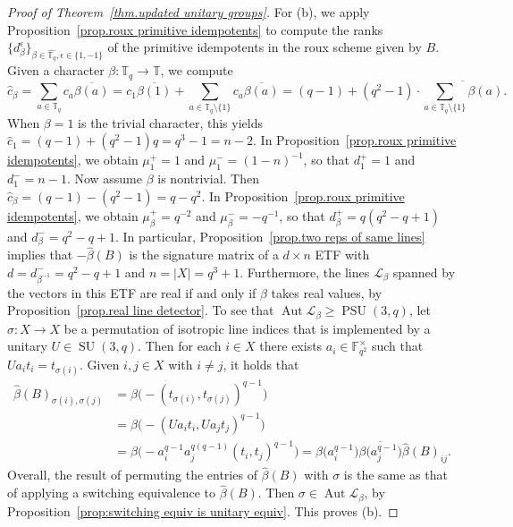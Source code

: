 \begin{proof}[Proof of Theorem~\ref{thm.updated unitary groups}]
For (b), we apply Proposition~\ref{prop.roux primitive idempotents} to compute the ranks $\{ d_\beta^\epsilon \}_{\beta \in \hat{\mathbb{T}_q}, \epsilon \in \{1,-1\}}$ of the primitive idempotents in the roux scheme given by $B$.
Given a character $\beta \colon \mathbb{T}_q \to \mathbb{T}$, we compute
\[
\hat{c}_{\beta} = \sum_{a \in \mathbb{T}_q} c_a \overline{\beta(a)}
= c_1 \overline{\beta(1)} + \sum_{a \in \mathbb{T}_q \setminus \{1\} } c_a \overline{\beta(a)}
= (q-1) + (q^2-1) \cdot \overline{ \sum_{a\in \mathbb{T}_q \setminus\{1\} } \beta(a) }.
\]
When $\beta=1$ is the trivial character, this yields $\hat{c}_1 = (q-1) + (q^2-1)q = q^3-1 = n-2$.
In Proposition~\ref{prop.roux primitive idempotents}, we obtain $\mu_1^+ = 1$ and $\mu_1^- = (1-n)^{-1}$, so that $d_1^+ = 1$ and $d_1^- = n-1$.
Now assume $\beta$ is nontrivial.
Then $\hat{c}_{\beta} = (q-1) - (q^2-1) = q - q^2$.
In Proposition~\ref{prop.roux primitive idempotents}, we obtain $\mu_\beta^+ = q^{-2}$ and $\mu_\beta^- = -q^{-1}$, so that $d_\beta^+ = q(q^2-q+1)$ and $d_\beta^- = q^2-q+1$.
In particular, Proposition~\ref{prop.two reps of same lines} implies that $- \hat{\beta}(B)$ is the signature matrix of a $d\times n$ ETF with $d = d_{\beta^{-1}}^- = q^2-q+1$ and $n = |X| = q^3+1$.
Furthermore, the lines $\mathscr{L}_\beta$ spanned by the vectors in this ETF are real if and only if $\beta$ takes real values, by Proposition~\ref{prop.real line detector}.
To see that $\operatorname{Aut} \mathscr{L}_\beta \geq \operatorname{PSU}(3,q)$, let $\sigma \colon X \to X$ be a permutation of isotropic line indices that is implemented by a unitary $U \in \operatorname{SU}(3,q)$.
Then for each $i \in X$ there exists $a_i \in \mathbb{F}_{q^2}^\times$ such that $U a_i t_i = t_{\sigma(i)}$.
Given $i,j \in X$ with $i \neq j$, it holds that 
\begin{align*}
\hat{\beta}(B)_{\sigma(i),\sigma(j)} &= \beta \bigl( - (t_{\sigma(i)},t_{\sigma(j)})^{q-1} \bigr) \\
&= \beta \bigl( - (U a_i t_i, U a_j t_j)^{q-1} \bigr) \\
&= \beta \bigl( - a_i^{q-1} a_j^{q(q-1)} (t_i, t_j)^{q-1} \bigr)
= \beta\bigl(a_i^{q-1}\bigr) \overline{\beta\bigl(a_j^{q-1}\bigr)} \hat{\beta}(B)_{ij}.
\end{align*}
Overall, the result of permuting the entries of $\hat{\beta}(B)$ with $\sigma$ is the same as that of applying a switching equivalence to $\hat{\beta}(B)$.
Then $\sigma \in \operatorname{Aut} \mathscr{L}_\beta$, by Proposition~\ref{prop:switching equiv is unitary equiv}.
This proves (b).


\end{proof}
